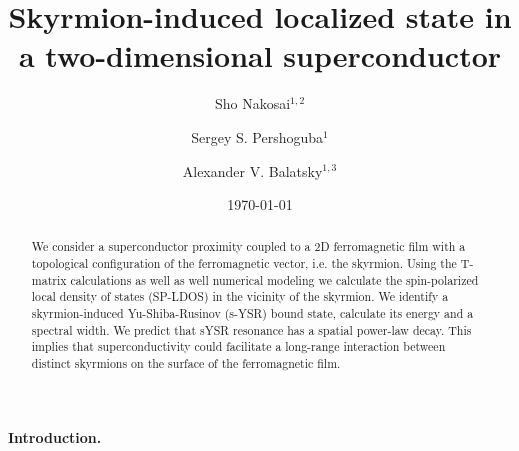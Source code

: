 \documentclass[twocolumn,showpacs,floatfix,nofootinbib,longbibliography]{revtex4-1}
\begin{document}
\title{Skyrmion-induced localized state in a two-dimensional superconductor}

\author{Sho Nakosai$^{1,2}$}
\author{Sergey S. Pershoguba$^{1}$}
\author{Alexander V. Balatsky$^{1,3}$}

\date{\today}


\begin{abstract}
We consider a superconductor proximity coupled to a 2D ferromagnetic film with a topological configuration of the ferromagnetic vector, i.e. the skyrmion. Using the T-matrix calculations as well as well numerical modeling we calculate the spin-polarized local density of states (SP-LDOS) in the vicinity of the skyrmion. We identify a skyrmion-induced Yu-Shiba-Rusinov (s-YSR) bound state, calculate its energy and a spectral width. We predict that sYSR resonance has a spatial power-law decay. This implies that superconductivity could facilitate a long-range interaction between distinct skyrmions on the surface of the ferromagnetic film.
\end{abstract}

\pacs{ }   


\maketitle
\paragraph*{Introduction.} \label{sec:intro}
\end{document}
